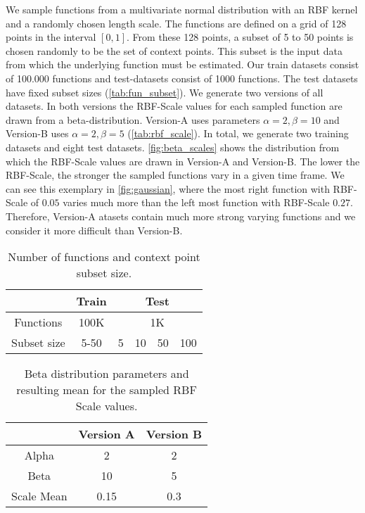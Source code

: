 We sample functions from a multivariate normal distribution with an RBF kernel and a randomly chosen length scale. The functions are defined on a grid of 128 points in the interval $[0,1]$. From these 128 points, a subset of 5 to 50 points is chosen randomly to be the set of context points. This subset is the input data from which the underlying function must be estimated. Our train datasets consist of 100.000 functions and test-datasets consist of 1000 functions. The test datasets have fixed subset sizes (\autoref{tab:fun_subset}). We generate two versions of all datasets. In both versions the RBF-Scale values for each sampled function are drawn from a beta-distribution. Version-A uses parameters $\alpha = 2, \beta = 10$ and Version-B uses $\alpha = 2, \beta = 5$ (\autoref{tab:rbf_scale}). In total, we generate two training datasets and eight test datasets. \autoref{fig:beta_scales} shows the distribution from which the RBF-Scale values are drawn in Version-A and Version-B. The lower the RBF-Scale, the stronger the sampled functions vary in a given time frame. We can see this exemplary in \autoref{fig:gaussian}, where the most right function with RBF-Scale of $0.05$ varies much more than the left most function with RBF-Scale $0.27$. Therefore, Version-A atasets contain much more strong varying functions and we consider it more difficult than Version-B.

\begin{table}[]
	\centering
	\caption{Number of functions and context point subset size.}
	\begin{tabular}{c c c c c c}
		\toprule
		& Train & \multicolumn{4}{c}{Test}\\
		\midrule
		Functions & 100K & \multicolumn{4}{c}{1K}\\
		Subset size & 5-50 & 5 & 10 & 50 & 100  \\\bottomrule
	\end{tabular}
	\label{tab:fun_subset}
\end{table}

\begin{table}[]
	\centering
	\caption{Beta distribution parameters and resulting mean for the sampled RBF Scale values.}
	\begin{tabular}{c c c}
		\toprule
		& Version A & Version B\\
		\midrule
		Alpha & 2 & 2\\
		Beta & 10 & 5  \\\midrule
		Scale Mean & 0.15 & 0.3\\\bottomrule
	\end{tabular}
	\label{tab:rbf_scale}
\end{table}


